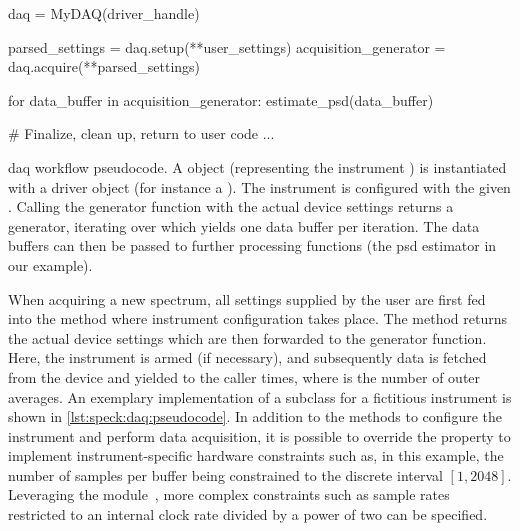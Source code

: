 \begin{listing}[htpb]
    \begin{pycode}
        daq = MyDAQ(driver_handle)

        parsed_settings = daq.setup(**user_settings)
        acquisition_generator = daq.acquire(**parsed_settings)

        for data_buffer in acquisition_generator:
            estimate_psd(data_buffer)

        # Finalize, clean up, return to user code
        ...
    \end{pycode}
    \caption[\gls{daq} workflow pseudocode]{
        \gls{daq} workflow pseudocode.
        A  object (representing the instrument ) is instantiated with a driver object (for instance a \href{https://github.com/microsoft/qcodes}{\qcodes} ).
        The instrument is configured with the given .
        Calling the generator function  with the actual device settings returns a generator, iterating over which yields one data buffer per iteration.
        The data buffers can then be passed to further processing functions (the \gls{psd} estimator in our example).
    }
    \label{lst:speck:daq:workflow}
\end{listing}

When acquiring a new spectrum, all settings supplied by the user are first fed into the  method where instrument configuration takes place.
The method returns the actual device settings which are then forwarded to the  generator function.
Here, the instrument is armed (if necessary), and subsequently data is fetched from the device and yielded to the caller  times, where  is the number of outer averages.
An exemplary implementation of a  subclass for a fictitious instrument is shown in \cref{lst:speck:daq:pseudocode}.
In addition to the methods to configure the instrument and perform data acquisition, it is possible to override the  property to implement instrument-specific hardware constraints such as, in this example, the number of samples per buffer being constrained to the discrete interval $[1, 2048]$.
Leveraging the  module~\cite{Hangleiter_qutil}, more complex constraints such as sample rates restricted to an internal clock rate divided by a power of two
can be specified.


